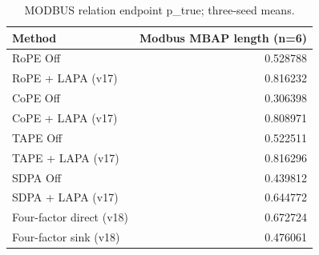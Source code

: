 \begin{table}[t]
\centering
\scriptsize
\caption{MODBUS relation endpoint p\_true; three-seed means.}
\begin{tabular}{lr}
\toprule
Method & Modbus MBAP length (n=6) \\
\midrule
RoPE Off & 0.528788 \\
RoPE + LAPA (v17) & 0.816232 \\
CoPE Off & 0.306398 \\
CoPE + LAPA (v17) & 0.808971 \\
TAPE Off & 0.522511 \\
TAPE + LAPA (v17) & 0.816296 \\
SDPA Off & 0.439812 \\
SDPA + LAPA (v17) & 0.644772 \\
Four-factor direct (v18) & 0.672724 \\
Four-factor sink (v18) & 0.476061 \\
\bottomrule
\end{tabular}
\end{table}
